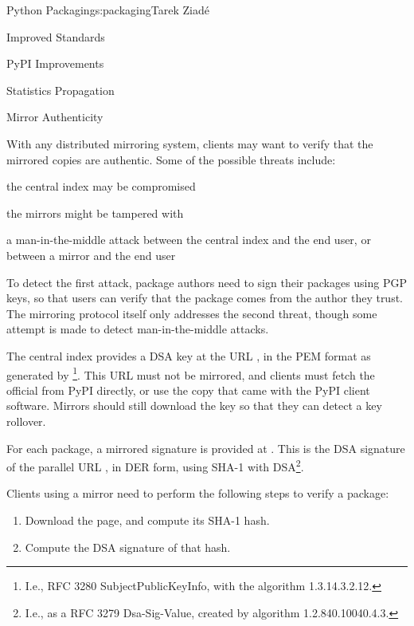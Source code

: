 \begin{aosachapter}{Python Packaging}{s:packaging}{Tarek Ziad\'{e}}
\begin{aosasect1}{Improved Standards}
\begin{aosasect2}{PyPI Improvements}
\begin{aosasect3}{Statistics Propagation}
\end{aosasect3}

\begin{aosasect3}{Mirror Authenticity}

With any distributed mirroring system, clients may want to verify that
the mirrored copies are authentic.  Some of the possible threats
include:

\begin{aosaitemize}

  \item the central index may be compromised

  \item the mirrors might be tampered with

  \item a man-in-the-middle attack between the central index and the end
  user, or between a mirror and the end user

\end{aosaitemize}

\noindent
To detect the first attack, package authors need to sign their
packages using PGP keys, so that users can verify that the package
comes from the author they trust.  The mirroring protocol itself only
addresses the second threat, though some attempt is made to detect
man-in-the-middle attacks.

The central index provides a DSA key at the URL , in
the PEM format as generated by \footnote{I.e.,
RFC 3280 SubjectPublicKeyInfo,
with the algorithm 1.3.14.3.2.12.}. This URL must not be mirrored,
and clients must fetch the official  from PyPI
directly, or use the copy that came with the PyPI client
software. Mirrors should still download the key so that they can
detect a key rollover.

For each package, a mirrored signature is provided at
.  This is the DSA signature of the parallel
URL , in DER form, using SHA-1 with
DSA\footnote{I.e., as a RFC 3279 Dsa-Sig-Value, created by algorithm
  1.2.840.10040.4.3.}.

Clients using a mirror need to perform the following steps to verify a
package:

\begin{enumerate}

  \item Download the  page, and compute its SHA-1 hash.

  \item Compute the DSA signature of that hash.


\end{enumerate}
\end{aosasect3}
\end{aosasect2}
\end{aosasect1}
\end{aosachapter}
